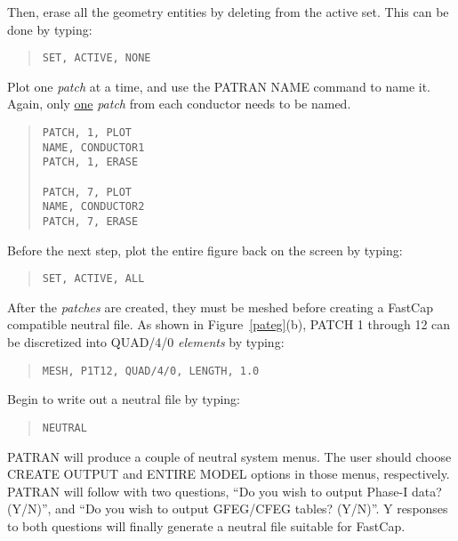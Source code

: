 Then, erase all the geometry entities by deleting from the active set.
This can be done by typing:
\begin{quote}
\begin{verbatim}
SET, ACTIVE, NONE
\end{verbatim}
\end{quote}

Plot one {\em patch} at a time, and use the PATRAN NAME command to
name it.  Again, only \underline{one} {\em patch} from each conductor
needs to be named.
\begin{quote}
\begin{verbatim}
PATCH, 1, PLOT
NAME, CONDUCTOR1
PATCH, 1, ERASE

PATCH, 7, PLOT
NAME, CONDUCTOR2
PATCH, 7, ERASE
\end{verbatim}
\end{quote}

Before the next step, plot the entire figure back on the screen by
typing:
\begin{quote}
\begin{verbatim}
SET, ACTIVE, ALL
\end{verbatim}
\end{quote}

After the {\em patches} are created, they must be meshed before
creating a FastCap compatible neutral file.  As shown in
Figure~\ref{pateg}(b), PATCH 1 through 12 can be discretized into
QUAD/4/0 {\em elements} by typing:
\begin{quote}
\begin{verbatim}
MESH, P1T12, QUAD/4/0, LENGTH, 1.0
\end{verbatim}
\end{quote}

Begin to write out a neutral file by typing:
\begin{quote}
\begin{verbatim}
NEUTRAL
\end{verbatim}
\end{quote}
PATRAN will produce a couple of neutral system menus.  The user should
choose CREATE OUTPUT and ENTIRE MODEL options in those menus,
respectively.  PATRAN will follow with two questions, ``Do you wish to
output Phase-I data? (Y/N)'', and ``Do you wish to output GFEG/CFEG
tables? (Y/N)''.  Y responses to both questions will finally generate
a neutral file suitable for FastCap.  

